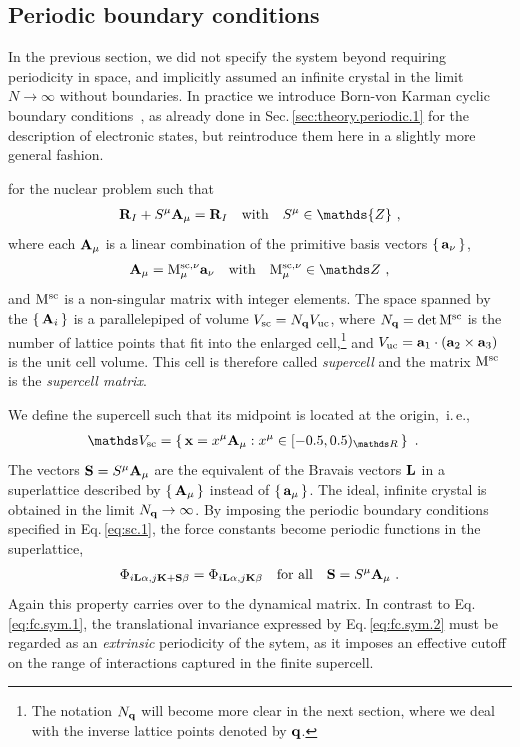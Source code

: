 \subsection{Periodic boundary conditions}
In the previous section, we did not specify the system beyond requiring periodicity in space, and implicitly assumed an infinite crystal in the limit $N \to \infty$ without boundaries. In practice we introduce Born-von Karman cyclic boundary conditions~\cite{born2013atomtheorie}, as already done in Sec.\,\ref{sec:theory.periodic.1} for the description of electronic states, but reintroduce them here in a slightly more general fashion.

 for the nuclear problem such that
\begin{align}
\b R_I + S^\mu \b A_\mu = \b R_I \quad\text{with}\quad S^\mu \in \mathds{Z}~,
\label{eq:sc.1}
\end{align}
where each ${\bf A}_\mu$ is a linear combination of the primitive basis vectors $\set{{\bf a}_\nu}$,
\begin{align}
{\bf A}_\mu = {\rm M}_{\mu}^{{\rm sc}, \nu} {\bf a}_\nu\quad\text{with}\quad {\rm M}_{\mu}^{{\rm sc}, \nu} \in \mathds Z~,
\end{align}
and $\rm M^{\rm sc}$ is a non-singular matrix with integer elements. The space spanned by the $\set{{\bf A}_i}$ is a parallelepiped of volume $V_{\rm sc} = N_{\bf q} V_{\rm uc}$, where $N_{\bf q} = \det {\rm M}^{\rm sc}$ is the number of lattice points that fit into the enlarged cell,\footnote{The notation $N_{\bf q}$ will become more clear in the next section, where we deal with the inverse lattice points denoted by $\bf q$.} and $V_{\rm uc} = {\bf a}_1 \cdot ({\bf a}_2 \times {\bf a}_3)$ is the unit cell volume. This cell is therefore called \emph{supercell} and the matrix ${\rm M}^{\rm sc}$ is the \emph{supercell matrix}.

We define the supercell such that its midpoint is located at the origin,~i.\,e.,~
\begin{align}
\mathds V_{\rm sc}
&= \set{{\bf x} = x^\mu {\bf A}_\mu : x^\mu \in {[-0.5, 0.5)_{\mathds R}}}~.
\label{eq:supercell}
\end{align}
The vectors \mbox{${\bf S} = S^\mu {\bf A}_\mu$} are the equivalent of the Bravais vectors ${\bf L}$ in a superlattice described by $\set{ {\bf A}_\mu }$ instead of $\set{ {\bf a}_\mu}$.
The ideal, infinite crystal is obtained in the limit $N_{\bf q} \rightarrow \infty$.
By imposing the periodic boundary conditions specified in Eq.\,\eqref{eq:sc.1}, the force constants become periodic functions in the superlattice,
\begin{align}
\Phi_{i {\bf L} \alpha, j {\bf K} + \b S \beta} 
= \Phi_{i {\bf L} \alpha, j {\bf K} \beta} \quad\text{for all}\quad \b S = S^\mu \b A_\mu~.
\label{eq:fc.sym.2}
\end{align}
Again this property carries over to the dynamical matrix. In contrast to Eq.\,\eqref{eq:fc.sym.1}, the translational invariance expressed by Eq.\,\eqref{eq:fc.sym.2} must be regarded as an \emph{extrinsic} periodicity of the sytem, as it imposes an effective cutoff on the range of interactions captured in the finite supercell.

